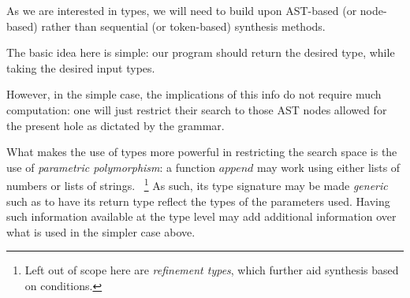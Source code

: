 \documentclass{article}
\begin{document}
As we are interested in types, we will need to build upon AST-based (or node-based) rather than sequential (or token-based) synthesis methods.




The basic idea here is simple: our program should return the desired type, while taking the desired input types.

However, in the simple case, the implications of this info do not require much computation: one will just restrict their search to those AST nodes allowed for the present hole as dictated by the grammar.

What makes the use of types more powerful in restricting the search space is the use of \emph{parametric polymorphism}: a function $append$ may work using either lists of numbers or lists of strings.
~\footnote{Left out of scope here are \emph{refinement types}, which further aid synthesis based on conditions.}
As such, its type signature may be made \emph{generic} such as to have its return type reflect the types of the parameters used. Having such information available at the type level may add additional information over what is used in the simpler case above.
\end{document}
